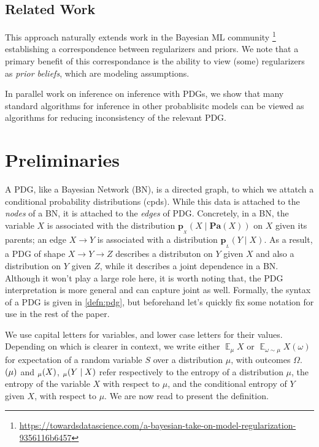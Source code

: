 \documentclass{article}
\theoremstyle{plain}
\theoremstyle{definition}
\let\H\relax
\DeclareMathOperator{\H}{\mathrm{H}} %
\DeclareMathOperator*{\Ex}{\mathbb{E}} %
\newcommand{\mat}[1]{\mathbf{#1}}
\newcommand{\bp}[1][L]{\mat{p}_{\!_{#1}\!}}
\begin{document}
\subsection{Related Work}

This approach naturally extends work in the Bayesian ML community%
\footnote{\url{https://towardsdatascience.com/a-bayesian-take-on-model-regularization-9356116b6457}}
establishing a correspondence between regularizers and priors.
We note that a primary benefit of this correspondance is the ability to view (some) regularizers as \emph{prior beliefs}, which are modeling assumptions.


In parallel work on inference on inference with PDGs, we show that many standard algorithms for inference in other probablisitc models can be viewed as algorithms for reducing inconsistency of the relevant PDG.


\section{Preliminaries}
A PDG, like a Bayesian Network (BN), is a directed graph, to which we attatch a conditional probability distributions (cpds). While this data is attached to the \emph{nodes} of a BN, it is attached to the \emph{edges} of PDG.
Concretely, in a BN, the variable $X$ is associated with the distribution $\bp[X](X \mid \mathbf{Pa}(X))$ on $X$ given its parents; an edge $X \to Y$ is associated with a distribution $\bp(Y \mid X)$.
As a result, a PDG of shape $X \to Y \rightarrow Z$ describes a distributon on $Y$ given $X$ and also a distribution on $Y$ given $Z$, while it describes a joint dependence in a BN.
Although it won't play a large role here, it is worth noting that, the PDG interpretation is more general and can capture joint as well.
Formally, the syntax of a PDG is given in \cref{defn:pdg}, but beforehand let's quickly fix some notation for use in the rest of the paper.

We use capital letters for variables, and lower case letters for their values.
Depending on which is clearer in context, we write either $\Ex_\mu X$ or $\Ex_{\omega \sim \mu} X(\omega)$ for expectation of a random variable $S$ over a distribution $\mu$, with outcomes $\Omega$.
$\H(\mu)$ and $\H_\mu(X)$, $\H_\mu(Y \mid X)$ refer respectively to the entropy of a distribution $\mu$, the entropy of the variable $X$ with respect to $\mu$, and the conditional entropy of $Y$ given $X$, with respect to $\mu$. We are now read to present the definition.
\end{document}
